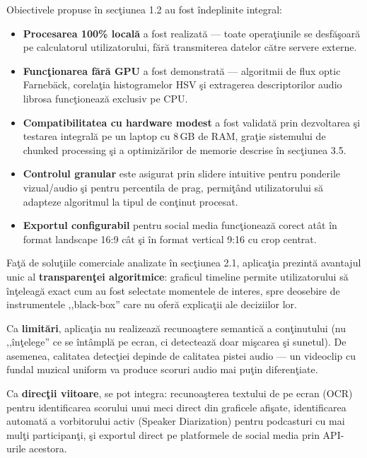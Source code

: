 \documentclass[12pt,a4paper]{article}
\begin{document}
Obiectivele propuse \^{i}n sec\c{t}iunea 1.2 au fost \^{i}ndeplinite integral:
\begin{itemize}[noitemsep]
    \item \textbf{Procesarea 100\% local\u{a}} a fost realizat\u{a}{} --- toate opera\c{t}iunile se desf\u{a}\c{s}oar\u{a}{} pe calculatorul utilizatorului, f\u{a}r\u{a}{} transmiterea datelor c\u{a}tre servere externe.
    \item \textbf{Func\c{t}ionarea f\u{a}r\u{a}{} GPU} a fost demonstrat\u{a}{} --- algoritmii de flux optic Farneb\"{a}ck, corela\c{t}ia histogramelor HSV \c{s}i extragerea descriptorilor audio librosa func\c{t}ioneaz\u{a}{} exclusiv pe CPU.
    \item \textbf{Compatibilitatea cu hardware modest} a fost validat\u{a}{} prin dezvoltarea \c{s}i testarea integral\u{a}{} pe un laptop cu 8\,GB de RAM, gra\c{t}ie sistemului de chunked processing \c{s}i a optimiz\u{a}rilor de memorie descrise \^{i}n sec\c{t}iunea 3.5.
    \item \textbf{Controlul granular} este asigurat prin slidere intuitive pentru ponderile vizual/audio \c{s}i pentru percentila de prag, permi\c{t}\^{a}nd utilizatorului s\u{a}{} adapteze algoritmul la tipul de con\c{t}inut procesat.
    \item \textbf{Exportul configurabil} pentru social media func\c{t}ioneaz\u{a}{} corect at\^{a}t \^{i}n format landscape 16:9 c\^{a}t \c{s}i \^{i}n format vertical 9:16 cu crop centrat.
\end{itemize}

Fa\c{t}\u{a}{} de solu\c{t}iile comerciale analizate \^{i}n sec\c{t}iunea 2.1, aplica\c{t}ia prezint\u{a}{} avantajul unic al \textbf{transparen\c{t}ei algoritmice}: graficul timeline permite utilizatorului s\u{a}{} \^{i}n\c{t}eleag\u{a}{} exact cum au fost selectate momentele de interes, spre deosebire de instrumentele ,,black-box'' care nu ofer\u{a}{} explica\c{t}ii ale deciziilor lor.

Ca \textbf{limit\u{a}ri}, aplica\c{t}ia nu realizeaz\u{a}{} recunoa\c{s}tere semantic\u{a}{} a con\c{t}inutului (nu ,,\^{i}n\c{t}elege'' ce se \^{i}nt\^{a}mpl\u{a}{} pe ecran, ci detecteaz\u{a}{} doar mi\c{s}carea \c{s}i sunetul). De asemenea, calitatea detec\c{t}iei depinde de calitatea pistei audio --- un videoclip cu fundal muzical uniform va produce scoruri audio mai pu\c{t}in diferen\c{t}iate.

Ca \textbf{direc\c{t}ii viitoare}, se pot integra: recunoa\c{s}terea textului de pe ecran (OCR) pentru identificarea scorului unui meci direct din graficele afi\c{s}ate, identificarea automat\u{a}{} a vorbitorului activ (Speaker Diarization) pentru podcasturi cu mai mul\c{t}i participan\c{t}i, \c{s}i exportul direct pe platformele de social media prin API-urile acestora.
\end{document}
